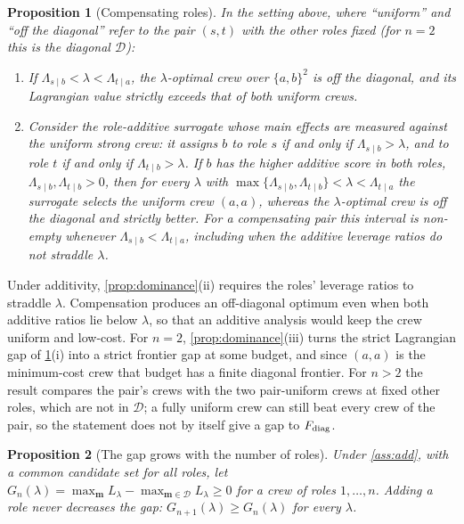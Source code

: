 \documentclass[11pt,a4paper]{article}
\newtheorem{proposition}{Proposition}
\theoremstyle{definition}
\theoremstyle{remark}
\theoremstyle{definition}
\newcommand{\crew}{\mathbf{m}}
\begin{document}
\begin{proposition}[Compensating roles]
\label{prop:complement}
In the setting above, where ``uniform'' and ``off the diagonal'' refer to the pair $(s,t)$ with the other roles fixed (for $n=2$ this is the diagonal $\mathcal D$):
\begin{enumerate}[label=(\roman*),leftmargin=*]
\item If $\Lambda_{s\mid b}<\lambda<\Lambda_{t\mid a}$, the $\lambda$-optimal crew over $\{a,b\}^2$ is off the diagonal, and its Lagrangian value strictly exceeds that of both uniform crews.
\item Consider the role-additive surrogate whose main effects are measured against the uniform strong crew: it assigns $b$ to role $s$ if and only if $\Lambda_{s\mid b}>\lambda$, and to role $t$ if and only if $\Lambda_{t\mid b}>\lambda$. If $b$ has the higher additive score in both roles, $\Lambda_{s\mid b},\Lambda_{t\mid b}>0$, then for every $\lambda$ with $\max\{\Lambda_{s\mid b},\Lambda_{t\mid b}\}<\lambda<\Lambda_{t\mid a}$ the surrogate selects the uniform crew $(a,a)$, whereas the $\lambda$-optimal crew is off the diagonal and strictly better. For a compensating pair this interval is non-empty whenever $\Lambda_{s\mid b}<\Lambda_{t\mid a}$, including when the additive leverage ratios do not straddle $\lambda$.
\end{enumerate}
\end{proposition}
Under additivity, \cref{prop:dominance}(ii) requires the roles' leverage ratios to straddle $\lambda$. Compensation produces an off-diagonal optimum even when both additive ratios lie below $\lambda$, so that an additive analysis would keep the crew uniform and low-cost. For $n=2$, \cref{prop:dominance}(iii) turns the strict Lagrangian gap of \cref{prop:complement}(i) into a strict frontier gap at some budget, and since $(a,a)$ is the minimum-cost crew that budget has a finite diagonal frontier. For $n>2$ the result compares the pair's crews with the two pair-uniform crews at fixed other roles, which are not in $\mathcal D$; a fully uniform crew can still beat every crew of the pair, so the statement does not by itself give a gap to $F_{\rm diag}$.

\begin{proposition}[The gap grows with the number of roles]
\label{prop:gap}
Under \cref{ass:add}, with a common candidate set for all roles, let $G_n(\lambda)=\max_{\crew}L_\lambda-\max_{\crew\in\mathcal D}L_\lambda\ge0$ for a crew of roles $1,\dots,n$. Adding a role never decreases the gap: $G_{n+1}(\lambda)\ge G_n(\lambda)$ for every $\lambda$.
\end{proposition}
\end{document}
